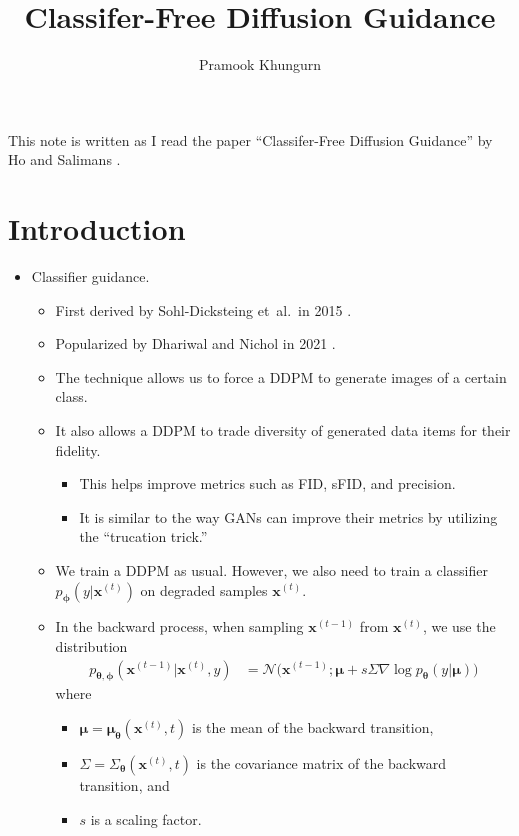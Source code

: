 \documentclass[10pt]{article}
\title{Classifer-Free Diffusion Guidance}
\author{Pramook Khungurn}
\newcommand{\ve}[1]{\mathbf{#1}}
\newcommand{\ves}[1]{\boldsymbol{#1}}
\newcommand{\etal}{{et~al.}}
\newcommand{\mcal}[1]{\mathcal{#1}}
\begin{document}
\maketitle

This note is written as I read the paper ``Classifer-Free Diffusion Guidance'' by Ho and Salimans \cite{Ho:2022}.

\section{Introduction}

\begin{itemize}
\item Classifier guidance.
\begin{itemize}
  \item First derived by Sohl-Dicksteing \etal\ in 2015 \cite{SohlDickstein:2015}.
  
  \item Popularized by Dhariwal and Nichol in 2021 \cite{Dhariwal:2021}.
  
  \item The technique allows us to force a DDPM to generate images of a certain class.
  
  \item It also allows a DDPM to trade diversity of generated data items for their fidelity.
  \begin{itemize}
    \item This helps improve metrics such as FID, sFID, and precision.
    \item It is similar to the way GANs can improve their metrics by utilizing the ``trucation trick.''
  \end{itemize}

  \item We train a DDPM as usual. However, we also need to train a classifier $p_{\ves{\phi}}(y|\ves{x}^{(t)})$ on degraded samples $\ve{x}^{(t)}$.
  
  \item In the backward process, when sampling $\ve{x}^{(t-1)}$ from $\ve{x}^{(t)}$, we use the distribution
  \begin{align*}
    p_{\ves{\theta}, \ves{\phi}}(\ve{x}^{(t-1)}|\ve{x}^{(t)}, y)
    &= \mcal{N}\big(\ve{x}^{(t-1)}; \ves{\mu} + s \Sigma \nabla \log p_{\ves{\theta}}(y | \ves{\mu})\big)
  \end{align*}
  where
  \begin{itemize}
    \item $\ves{\mu} = \ves{\mu}_{\ves{\theta}}(\ve{x}^{(t)},t)$ is the mean of the backward transition,
    \item $\Sigma = \Sigma_{\ves{\theta}}(\ve{x}^{(t)},t)$ is the covariance matrix of the backward transition, and
    \item $s$ is a scaling factor.
  \end{itemize}
  

\end{itemize}
\end{itemize}
\end{document}

